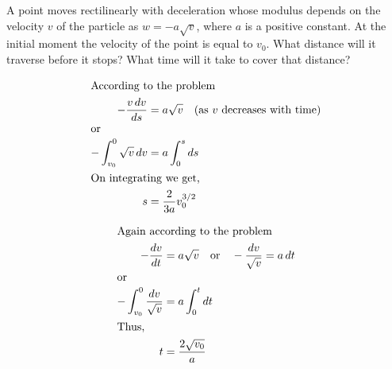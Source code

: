 
\item A point moves rectilinearly with deceleration whose modulus depends on the velocity \( v \) of the particle as \( w = -a\sqrt{v} \), where \( a \) is a positive constant. At the initial moment the velocity of the point is equal to \( v_0 \). What distance will it traverse before it stops? What time will it take to cover that distance?
    

\begin{solution}
    \begin{center}
    \end{center}

    \begin{align*}
        \intertext{According to the problem}
        -\dfrac{v \, dv}{ds} &= a\sqrt{v} \quad \text{(as $v$ decreases with time)}\\
        \intertext{or}
        -\int_{v_0}^{0} \sqrt{v} \, dv &= a \int_{0}^{s} ds\\
        \intertext{On integrating we get,}
        s &= \dfrac{2}{3a} v_0^{3/2}
    \end{align*}

    \begin{align*}
        \intertext{Again according to the problem}
        -\dfrac{dv}{dt} &= a \sqrt{v} \quad \text{or} \quad -\dfrac{dv}{\sqrt{v}} = a \, dt \\
        \intertext{or}
        -\int_{v_0}^{0} \dfrac{dv}{\sqrt{v}} &= a \int_{0}^{t} dt\\
        \intertext{Thus,}
        t &= \dfrac{2 \sqrt{v_0}}{a}
    \end{align*}
\end{solution}
